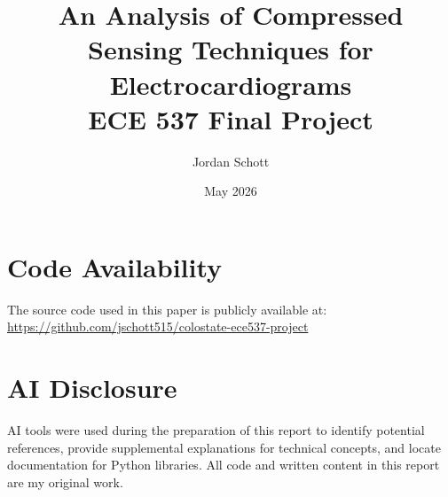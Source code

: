 \documentclass{article}
\title{An Analysis of Compressed Sensing Techniques for Electrocardiograms \\[0.5em] \large ECE 537 Final Project}
\author{Jordan Schott}
\date{May 2026}
\begin{document}
\maketitle
\newpage

\newpage

\newpage

\newpage

\newpage


\section*{Code Availability}
The source code used in this paper is publicly available at:
\newline
\url{https://github.com/jschott515/colostate-ece537-project}

\section*{AI Disclosure}
AI tools were used during the preparation of this report to identify potential references, provide supplemental explanations for technical concepts, and locate documentation for Python libraries.
All code and written content in this report are my original work.

\newpage

\end{document}
